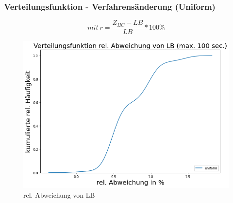 \documentclass{beamer}
\begin{document}
\begin{frame}

\frametitle{Verteilungsfunktion - Verfahrensänderung (Uniform)}

\begin{footnotesize}
\begin{equation}
mit \ r = \frac{Z_{HC}-LB}{LB} * 100\%
\end{equation}
\end{footnotesize}

\begin{figure}[!htbp]
\begin{center}
\includegraphics[scale=0.3]{img/dist1.png}
\end{center}
\caption{rel. Abweichung von LB}
\label{fig:architecture}
\end{figure}



\end{frame}
\end{document}
